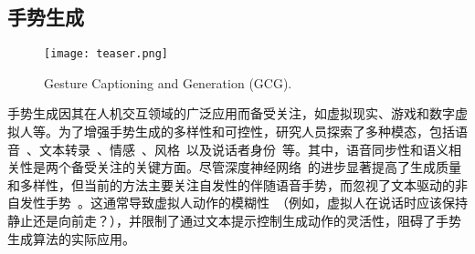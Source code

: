 


\subsection{手势生成}

\begin{figure*}[!h]
  \centering
  \texttt{[image: teaser.png]}
  \caption{Gesture Captioning and Generation (GCG).} %
  \label{fig:teaser}
\end{figure*}


手势生成因其在人机交互领域的广泛应用而备受关注，如虚拟现实、游戏和数字虚拟人等。为了增强手势生成的多样性和可控性，研究人员探索了多种模态，包括语音~\cite{yang2023diffusestylegesture, yang2023unifiedgesture,xu2025mambatalk}、文本转录~\cite{zhi2023livelyspeaker, pang2023bodyformer,liu2024emage}、情感~\cite{qi2024emotiongesture, qi2024weakly}、风格~\cite{ao2023gesturediffuclip, yang2023diffusestylegesture, ghorbani2023zeroeggs}以及说话者身份~\cite{yang2023diffusestylegesture+}等。其中，语音同步性和语义相关性是两个备受关注的关键方面。尽管深度神经网络~\cite{liu2024emage, xu2025mambatalk, cheng2024siggesture}的进步显著提高了生成质量和多样性，但当前的方法主要关注自发性的伴随语音手势，而忽视了文本驱动的非自发性手势~\cite{yang2024freetalker}。这通常导致虚拟人动作的模糊性~\cite{chen2024syntalker}（例如，虚拟人在说话时应该保持静止还是向前走？），并限制了通过文本提示控制生成动作的灵活性，阻碍了手势生成算法的实际应用。


